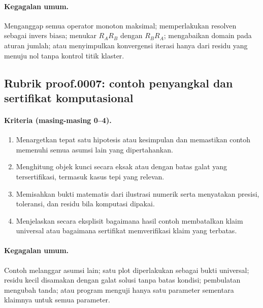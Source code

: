 \paragraph{Kegagalan umum.}
Menganggap semua operator monoton maksimal; memperlakukan resolven sebagai
invers biasa; menukar $R_AR_B$ dengan $R_BR_A$; mengabaikan domain pada aturan
jumlah; atau menyimpulkan konvergensi iterasi hanya dari residu yang menuju nol
tanpa kontrol titik klaster.

\subsection{Rubrik proof.0007: contoh penyangkal dan sertifikat komputasional}
\label{orig03:rubric:proof:0007}

\paragraph{Kriteria (masing-masing 0--4).}
\begin{enumerate}
  \item Menargetkan tepat satu hipotesis atau kesimpulan dan memastikan contoh
  memenuhi semua asumsi lain yang dipertahankan.
  \item Menghitung objek kunci secara eksak atau dengan batas galat yang
  tersertifikasi, termasuk kasus tepi yang relevan.
  \item Memisahkan bukti matematis dari ilustrasi numerik serta menyatakan
  presisi, toleransi, dan residu bila komputasi dipakai.
  \item Menjelaskan secara eksplisit bagaimana hasil contoh membatalkan klaim
  universal atau bagaimana sertifikat memverifikasi klaim yang terbatas.
\end{enumerate}

\paragraph{Kegagalan umum.}
Contoh melanggar asumsi lain; satu plot diperlakukan sebagai bukti universal;
residu kecil disamakan dengan galat solusi tanpa batas kondisi; pembulatan
mengubah tanda; atau program menguji hanya satu parameter sementara klaimnya
untuk semua parameter.

